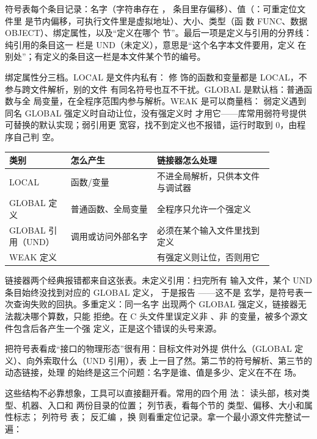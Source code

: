 符号表每个条目记录：名字（字符串存在 ，
条目里存偏移）、值（：可重定位文件里
是节内偏移，可执行文件里是虚拟地址）、大小、类型（函
数 FUNC、数据 OBJECT）、绑定属性，以及“定义在哪个
节”。最后一项是定义与引用的分界线：纯引用的条目这一
栏是 UND（未定义），意思是“这个名字本文件要用，定义
在别处”；有定义的条目这一栏是本文件某个节的编号。

绑定属性分三档。LOCAL 是文件内私有： 修
饰的函数和变量都是 LOCAL，不参与跨文件解析，别的文件
有同名符号也互不干扰。GLOBAL 是默认档：普通函数与全
局变量，在全程序范围内参与解析。WEAK 是可以商量档：
弱定义遇到同名 GLOBAL 强定义时自动让位，没有强定义时
才用它——库常用弱符号提供可替换的默认实现；弱引用更
宽容，找不到定义也不报错，运行时取到 0，由程序自己判
空。

\begin{longtable}{L{0.2\linewidth}L{0.28\linewidth}L{0.38\linewidth}}
\toprule
类别 & 怎么产生 & 链接器怎么处理 \\
\midrule
LOCAL &  函数/变量 & 不进全局解析，只供本文件与调试器 \\
GLOBAL 定义 & 普通函数、全局变量 & 全程序只允许一个强定义 \\
GLOBAL 引用（UND） & 调用或访问外部名字 & 必须在某个输入文件里找到定义 \\
WEAK 定义 &  & 有强定义则让位，否则用它 \\
\bottomrule
\end{longtable}

链接器两个经典报错都来自这张表。未定义引用：扫完所有
输入文件，某个 UND 条目始终没找到对应的 GLOBAL 定义，
于是报告 ——这不是
玄学，是符号表一次查询失败的回执。多重定义：同一名字
出现两个 GLOBAL 强定义，链接器无法裁决哪个算数，只能
拒绝。在 C 头文件里误定义非 、非
 的变量，被多个源文件包含后各产生一个强
定义，正是这个错误的头号来源。

把符号表看成“接口的物理形态”很有用：目标文件对外提
供什么（GLOBAL 定义）、向外索取什么（UND 引用），表
上一目了然。第二节的符号解析、第三节的动态链接，处理
的始终是这三个问题：名字是谁、值是多少、定义在不在
场。

这些结构不必靠想象，工具可以直接翻开看。常用的四个用
法： 读头部，核对类型、机器、入口和
两份目录的位置； 列节表，看每个节的
类型、偏移、大小和属性标志； 列符号
表； 反汇编 ，换
 则看重定位记录。拿一个最小源文件完整试一
遍：

